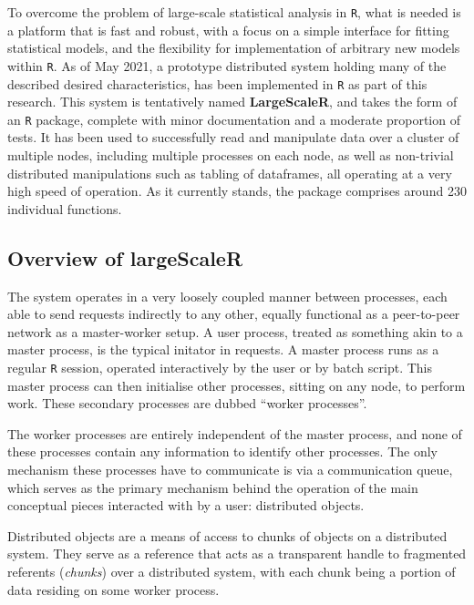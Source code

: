 To overcome the problem of large-scale statistical analysis in \texttt{R}, what is needed is a platform that is fast and robust, with a focus on a simple interface for fitting statistical models, and the flexibility for implementation of arbitrary new models within \texttt{R}.
As of May 2021, a prototype distributed system holding many of the described desired characteristics, has been implemented in \texttt{R} as part of this research.
This system is tentatively named \textbf{LargeScaleR}, and takes the form of an \texttt{R} package, complete with minor documentation and a moderate proportion of tests.
It has been used to successfully read and manipulate data over a cluster of multiple nodes, including multiple processes on each node, as well as non-trivial distributed manipulations such as tabling of dataframes, all operating at a very high speed of operation.
As it currently stands, the package comprises around 230 individual functions.

\subsection{Overview of \textbf{largeScaleR}}\label{sec:sys-imp}

The system operates in a very loosely coupled manner between processes, each able to send requests indirectly to any other, equally functional as a peer-to-peer network as a master-worker setup.
A user process, treated as something akin to a master process, is the typical initator in requests. 
A master process runs as a regular \texttt{R} session, operated interactively by the user or by batch script.
This master process can then initialise other processes, sitting on any node, to perform work.
These secondary processes are dubbed ``worker processes''.

The worker processes are entirely independent of the master process, and none of these processes contain any information to identify other processes.
The only mechanism these processes have to communicate is via a communication queue, which serves as the primary mechanism behind the operation of the main conceptual pieces interacted with by a user: distributed objects.

Distributed objects are a means of access to chunks of objects on a distributed system\cite{emmerich2000engineering}.
They serve as a reference that acts as a transparent handle to fragmented referents (\textit{chunks}) over a distributed system, with each chunk being a portion of data residing on some worker process.

